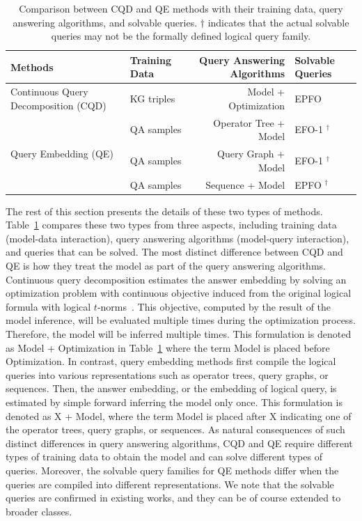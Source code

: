 \documentclass[11pt]{article}
\begin{document}
\begin{table}[t]
\small\centering
\caption{Comparison between CQD and QE methods with their training data, query answering algorithms, and solvable queries. $\dag$ indicates that the actual solvable queries may not be the formally defined logical query family.}\label{tab:compare-method}
\begin{tabular}{llrl}
\toprule
Methods                        & Training Data & Query Answering Algorithms & Solvable Queries \\ \midrule
Continuous Query Decomposition (CQD)
  & KG triples                     & Model + Optimization          & EPFO             \\\midrule
\multirow{3}{*}{Query Embedding (QE)} & QA samples & Operator Tree + Model & EFO-1 $^\dag$ \\
                                 & QA samples & Query Graph + Model & EFO-1 $^\dag$ \\
                                 & QA samples & Sequence + Model & EPFO $^\dag$  \\ \bottomrule
\end{tabular}
\end{table}

The rest of this section presents the details of these two types of methods. Table~\ref{tab:compare-method} compares these two types from three aspects, including training data (model-data interaction), query answering algorithms (model-query interaction), and queries that can be solved.
The most distinct difference between CQD and QE is how they treat the model as part of the query answering algorithms.
Continuous query decomposition estimates the answer embedding by solving an optimization problem with continuous objective induced from the original logical formula with logical $t$-norms~\cite{Hajek1998MetamathematicsFuzzy}. This objective, computed by the result of the model inference, will be evaluated multiple times during the optimization process. Therefore, the model will be inferred multiple times. This formulation is denoted as Model + Optimization in Table~\ref{tab:compare-method} where the term Model is placed before Optimization.
In contrast, query embedding methods first compile the logical queries into various representations such as operator trees, query graphs, or sequences. Then, the answer embedding, or the embedding of logical query, is estimated by simple forward inferring the model only once. This formulation is denoted as X + Model, where the term Model is placed after X indicating one of the operator trees, query graphs, or sequences.
As natural consequences of such distinct differences in query answering algorithms, CQD and QE require different types of training data to obtain the model and can solve different types of queries. Moreover, the solvable query families for QE methods differ when the queries are compiled into different representations. We note that the solvable queries are confirmed in existing works, and they can be of course extended to broader classes.
\end{document}
